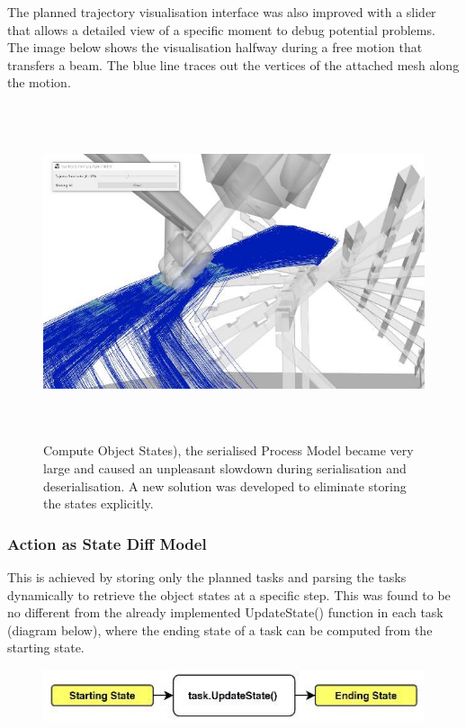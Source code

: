 \documentclass[11pt]{book}
\begin{document}
\vspace{1\baselineskip}
The planned trajectory visualisation interface was also improved with a slider that allows a detailed view of a specific moment to debug potential problems. The image below shows the visualisation halfway during a free motion that transfers a beam. The blue line traces out the vertices of the attached mesh along the motion.

\begin{figure}[H]
\includegraphics[width=15.92cm,height=9.81cm]{./images/image11.jpeg}
\caption{Compute Object States), the serialised Process Model became very large and caused an unpleasant slowdown during serialisation and deserialisation. A new solution was developed to eliminate storing the states explicitly.}
\label{fig:compute_object_states_serialised_process}
\end{figure}


\subsubsection{Action as State Diff Model}

This is achieved by storing only the planned tasks and parsing the tasks dynamically to retrieve the object states at a specific step. This was found to be no different from the already implemented UpdateState() function in each task (diagram below), where the ending state of a task can be computed from the starting state. 

\begin{figure}[H]
\includegraphics[width=11.73cm,height=1.54cm]{./images/image12.jpeg}
\end{figure}
\end{document}
